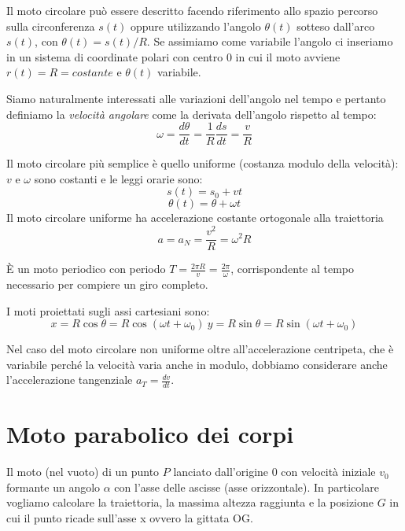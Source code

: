 \documentclass[class=book, crop=false, oneside, 12pt]{standalone}
\begin{document}
Il moto circolare può essere descritto facendo riferimento allo spazio percorso sulla circonferenza \(s(t)\) oppure 
utilizzando l'angolo \(\theta (t)\) sotteso dall'arco \(s(t)\), con \(\theta(t) = s(t)/R\).
Se assimiamo come variabile l'angolo ci inseriamo in un sistema di coordinate polari con centro \(0\) in cui il moto avviene \(r(t) = R = costante\) e \(\theta(t)\) variabile.

Siamo naturalmente interessati alle variazioni dell'angolo nel tempo e pertanto definiamo la \emph{velocità angolare} come la derivata dell'angolo rispetto al tempo:
\begin{equation}
  \omega = \frac{d \theta}{dt} = \frac{1}{R} \frac {ds} {dt} = \frac{v}{R}
\end{equation}

Il moto circolare più semplice è quello uniforme (costanza modulo della velocità): \(v\) e \(\omega\) sono costanti e le leggi orarie sono:
\begin{equation}
  s(t) = s_0 + vt
\end{equation}
\begin{equation}
  \theta(t) = \theta + \omega t
\end{equation}
Il moto circolare uniforme ha accelerazione costante ortogonale alla traiettoria
\begin{equation}
  a = a_N = \frac{v^2}{R} = \omega^2 R
\end{equation}

È un moto periodico con periodo \(T = \frac{2 \pi R}{v} = \frac{2 \pi}{\omega}\), corrispondente al tempo necessario per compiere un giro completo.

I moti proiettati sugli assi cartesiani sono:
\begin{equation}
  x = R \cos \theta = R \cos (\omega t + \omega_0) \
  y = R \sin \theta = R \sin (\omega t + \omega_0)
\end{equation}

Nel caso del moto circolare non uniforme oltre all'accelerazione centripeta, che è variabile perché la velocità varia anche in modulo, dobbiamo considerare anche l'accelerazione tangenziale \(a_T = \frac{dv}{dt} \).

\section{Moto parabolico dei corpi}

Il moto (nel vuoto) di un punto \(P\) lanciato dall'origine \(0\) con velocità iniziale \(v_0\) formante un angolo \(\alpha\) con l'asse delle ascisse (asse orizzontale).
In particolare vogliamo calcolare la traiettoria, la massima altezza raggiunta e la posizione \(G\) in cui il punto ricade sull'asse x ovvero la gittata OG.
\end{document}
